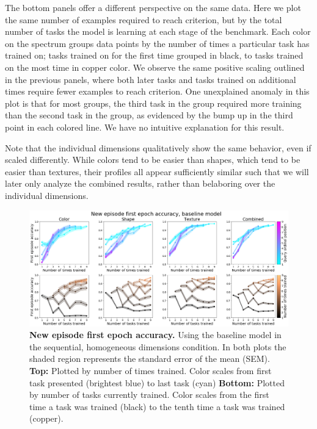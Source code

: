 The bottom panels offer a different perspective on the same data. Here we plot the same number of examples required to reach criterion, but by the total number of tasks the model is learning at each stage of the benchmark. Each color on the spectrum groups data points by the number of times a particular task has trained on; tasks trained on for the first time grouped in black, to tasks trained on the most time in copper color. We observe the same positive scaling outlined in the previous panels, where both later tasks and tasks trained on additional times require fewer examples to reach criterion. One unexplained anomaly in this plot is that for most groups, the third task in the group required more training than the second task in the group, as evidenced by the bump up in the third point in each colored line. We have no intuitive explanation for this result. 

Note that the individual dimensions qualitatively show the same behavior, even if scaled differently. While colors tend to be easier than shapes, which tend to be easier than textures, their profiles all appear sufficiently similar such that we will later only analyze the combined results, rather than belaboring over the individual dimensions. 

\begin{figure}[!htb]
\centering
\includegraphics[width=\linewidth]{ch-results/figures/baseline_sequential/first_episode_accuracy.png}
\caption[New episode first epoch accuracy.]{ {\bf New episode first epoch accuracy.} Using the baseline model in the sequential, homogeneous dimensions condition. In both plots the shaded region represents the standard error of the mean (SEM). \textbf{Top:} Plotted by number of times trained. Color scales from first task presented (brightest blue) to last task (cyan) \textbf{Bottom:} Plotted by number of tasks currently trained. Color scales from the first time a task was trained (black) to the tenth time a task was trained (copper).}
\label{fig:results-baseline-sequential-first-episode-accuracy}
\end{figure}

